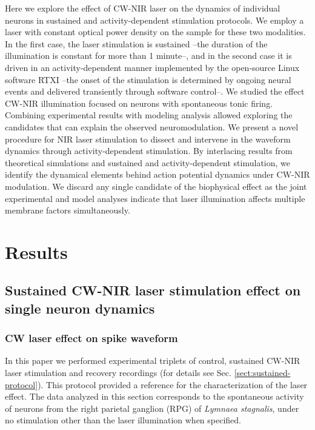 Here we explore the effect of CW-NIR laser on the dynamics of individual neurons in sustained and activity-dependent stimulation protocols. We employ a laser with constant optical power density on the sample for these two modalities. In the first case, the laser stimulation is sustained --the duration of the illumination is constant for more than 1 minute--, and in the second case it is driven in an activity-dependent manner implemented by the open-source Linux software RTXI\parencite{patel_hard_2017} --the onset of the stimulation is determined by ongoing neural events and delivered transiently through software control--.
We studied the effect CW-NIR illumination focused on neurons with spontaneous tonic firing. Combining experimental results with modeling analysis allowed exploring the candidates that can explain the observed neuromodulation. We present a novel procedure for NIR laser stimulation to dissect and intervene in the waveform dynamics through activity-dependent stimulation. By interlacing results from theoretical simulations and sustained and activity-dependent stimulation, we identify the dynamical elements behind action potential dynamics under CW-NIR modulation. We discard any single candidate of the biophysical effect as the joint experimental and model analyses indicate that laser illumination affects multiple membrane factors simultaneously.



\section{Results}

\subsection{Sustained CW-NIR laser stimulation effect on single neuron dynamics}
\subsubsection{CW laser effect on spike waveform}
In this paper we performed experimental triplets of control, sustained CW-NIR laser stimulation and recovery recordings (for details see Sec. \ref{sect:sustained-protocol}). This protocol provided a reference for the characterization of the laser effect. The data analyzed in this section corresponds to the spontaneous activity of neurons from the right parietal ganglion (RPG) of \textit{Lymnaea stagnalis}, under no stimulation other than the laser illumination when specified.


